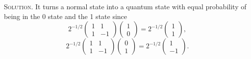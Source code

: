 \documentclass{article}[12pt, a4paper]
\newenvironment{solution}{\par\noindent\textsc{Solution. }}{\\\\\par}
\begin{document}
\begin{solution}
    It turns a normal state into a quantum state with equal probability of being in the 0 state and the 1 state since
    \[
    2^{-1/2} \begin{pmatrix} 1 & 1 \\ 1 & -1 \end{pmatrix} \begin{pmatrix} 1 \\ 0 \end{pmatrix} = 2^{-1/2} \begin{pmatrix} 1 \\ 1 \end{pmatrix},
    \]
    \[
    2^{-1/2} \begin{pmatrix} 1 & 1 \\ 1 & -1 \end{pmatrix} \begin{pmatrix} 0 \\ 1 \end{pmatrix} = 2^{-1/2} \begin{pmatrix} 1 \\ -1 \end{pmatrix}.
    \]
\end{solution}
\end{document}
